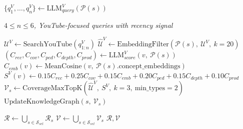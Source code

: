 \documentclass[varwidth=8.25in,border=8pt]{standalone}
\begin{document}
\begin{algorithmic}[1]
        \State $\{q^{V}_{1}, \dots, q^{V}_{n}\} \leftarrow \text{LLM}^{V}_{query}(\mathcal{P}(s))$
\Statex \hspace*{2.0em}\parbox[t]{0.90\linewidth}{\raggedright\scriptsize\itshape $4 \leq n \leq 6$, YouTube-focused queries with recency signal}
        \State $\mathcal{U}^{V} \leftarrow \text{SearchYouTube}(q^{V}_{1:n})$
        \State $\widehat{\mathcal{U}}^{V} \leftarrow \text{EmbeddingFilter}(\mathcal{P}(s),\ \mathcal{U}^{V},\ k{=}20)$
            \State $(C_{rec}, C_{cov}, C_{ped}, C_{depth}, C_{prod}) \leftarrow \text{LLM}^{V}_{score}(v,\ \mathcal{P}(s))$
            \State $C_{emb}(v) \leftarrow \text{MeanCosine}(v,\ \mathcal{P}(s).\text{concept\_embeddings})$
            \State $S^{V}(v) \leftarrow 0.15C_{rec} + 0.25C_{cov} + 0.15C_{emb} + 0.20C_{ped} + 0.15C_{depth} + 0.10C_{prod}$
        \EndFor
        \State $\mathcal{V}_{s} \leftarrow \text{CoverageMaxTopK}(\widehat{\mathcal{U}}^{V},\ S^{V},\ k{=}3,\ \text{min\_types}{=}2)$
        \State $\text{UpdateKnowledgeGraph}(s,\ \mathcal{V}_{s})$
    \EndIf
\EndFor

\State
\State $\mathcal{R} \leftarrow \bigcup_{s \in \mathcal{S}_{sel}} \mathcal{R}_{s}$
\State $\mathcal{V} \leftarrow \bigcup_{s \in \mathcal{S}_{sel}} \mathcal{V}_{s}$
\State \Return $\mathcal{R}, \mathcal{V}$
\end{algorithmic}
\end{document}
